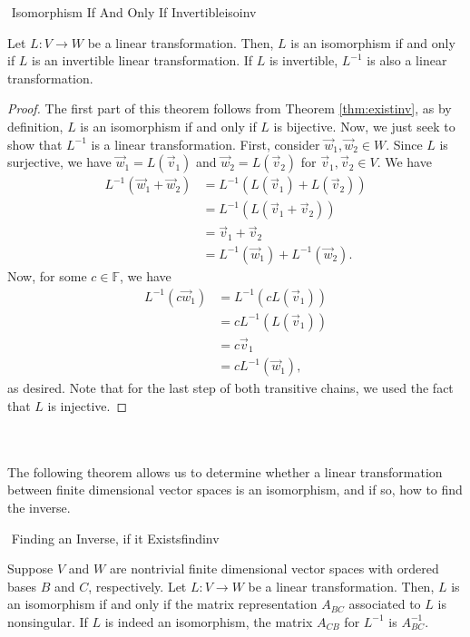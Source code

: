         \begin{theorem}{\Stop\,\,Isomorphism If And Only If Invertible}{isoinv}
            
            Let \(L:V\to W\) be a linear transformation. Then, \(L\) is an isomorphism if and only if \(L\) is an invertible linear transformation. If \(L\) is invertible, \(L^{-1}\) is also a linear transformation.
            \begin{proof}
                The first part of this theorem follows from Theorem \ref{thm:existinv}, as by definition, \(L\) is an isomorphism if and only if \(L\) is bijective. Now, we just seek to show that \(L^{-1}\) is a linear transformation. First, consider \(\vec{w}_1,\vec{w}_2\in W\). Since \(L\) is surjective, we have \(\vec{w}_1=L(\vec{v}_1)\) and \(\vec{w}_2=L(\vec{v}_2)\) for \(\vec{v}_1,\vec{v}_2\in V\). We have
                \begin{align*}
                    L^{-1}(\vec{w}_1+\vec{w}_2)&=L^{-1}(L(\vec{v}_1)+L(\vec{v}_2)) \\
                    &=L^{-1}(L(\vec{v}_1+\vec{v}_2)) \\
                    &=\vec{v}_1+\vec{v}_2 \\
                    &=L^{-1}(\vec{w}_1)+L^{-1}(\vec{w}_2).
                \end{align*}
                Now, for some \(c\in\mathbb{F}\), we have
                \begin{align*}
                    L^{-1}(c\vec{w}_1)&=L^{-1}(cL(\vec{v}_1)) \\
                    &=cL^{-1}(L(\vec{v}_1)) \\
                    &=c\vec{v}_1 \\
                    &=cL^{-1}(\vec{w}_1),
                \end{align*}
                as desired. Note that for the last step of both transitive chains, we used the fact that \(L\) is injective.
            \end{proof}

        \end{theorem}
        \vphantom
        \\
        \\
        The following theorem allows us to determine whether a linear transformation between finite dimensional vector spaces is an isomorphism, and if so, how to find the inverse.
        \begin{theorem}{\Stop\,\,Finding an Inverse, if it Exists}{findinv}

            Suppose \(V\) and \(W\) are nontrivial finite dimensional vector spaces with ordered bases \(B\) and \(C\), respectively. Let \(L:V\to W\) be a linear transformation. Then, \(L\) is an isomorphism if and only if the matrix representation \(A_{BC}\) associated to \(L\) is nonsingular. If \(L\) is indeed an isomorphism, the matrix \(A_{CB}\) for \(L^{-1}\) is \(A_{BC}^{-1}\).
            
        \end{theorem}
